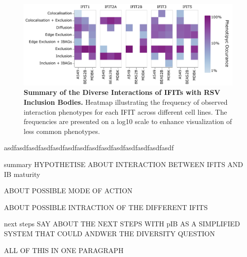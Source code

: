 \begin{figure}
    \centering
    \includegraphics[width=1\linewidth]{08. Chapter 3/Figs/heatmap_infection.pdf}
    \caption[Summary of the Diverse Interactions of IFITs with RSV Inclusion Bodies.]{\textbf{Summary of the Diverse Interactions of IFITs with RSV Inclusion Bodies.} Heatmap illustrating the frequency of observed interaction phenotypes for each IFIT across different cell lines. The frequencies are presented on a log10 scale to enhance visualization of less common phenotypes.}
    \label{fig:Summary of the Diverse Interactions of IFITs with RSV Inclusion Bodies}
\end{figure}

asdfasdfasdfasdfasdfasdfasdfasdfasdfasdfasdfasdfasdfasdf

summary
HYPOTHETISE ABOUT INTERACTION BETWEEN IFITS AND IB maturity

ABOUT POSSIBLE MODE OF ACTION

ABOUT POSSIBLE INTRACTION OF THE DIFFERENT IFITS


next steps
SAY ABOUT THE NEXT STEPS WITH pIB AS A SIMPLIFIED SYSTEM THAT COULD ANDWER THE DIVERSITY QUESTION


ALL OF THIS IN ONE PARAGRAPH

